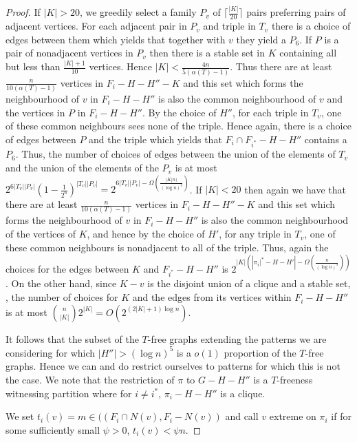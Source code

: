 \documentclass[12pt]{article}
\theoremstyle{definition}
\begin{document}
\begin{proof}
If $|K| >20$, we greedily  select a family $P_v$   of $\lceil \frac{|K|}{20} \rceil$ pairs 
preferring pairs of adjacent vertices. For each  adjacent pair in $P_v$ and triple in $T_v$ there is a choice of edges between them which yields that together 
with $v$ they yield a $P_6$. If $P$ is a pair of nonadjacent vertices in $P_v$ then there is a stable set in $K$ containing all but  less than $\frac{|K|+1}{10}$
vertices. Hence $|K|<\frac{4n}{5(\alpha(T)-1)}$. Thus there are at least $\frac{n}{10(\alpha(T)-1)}$ vertices in $F_i-H-H''-K$ and this set which forms the neighbourhood of $v$ 
in $F_i-H-H''$ is also the common neighbourhood of $v$ and the vertices in $P$ in $F_i-H-H''$. By the choice of $H''$, for each triple  in $T_v$, one of these common neighbours 
sees none of the triple.  Hence again,  there is a choice of edges between $P$ and the triple  which yields that $F_i \cap F_{i^*}-H-H''$
contains  a $P_6$. Thus, the number of choices of edges between the union of the elements of $T_v$ and the union of the elements 
of the $P_v$ is at most $2^{6|T_v||P_v|}(1-\frac{1}{2^6})^{|T_v||P_v|}=  2^{6|T_v||P_v|- \Omega(\frac{|K|n)}{(\log n)^3})}$. 
If $|K|<20$ then again we have that there are at least $\frac{n}{10(\alpha(T)-1)}$ vertices in $F_i-H-H''-K$ and this set which forms the neighbourhood of $v$ 
in $F_i-H-H''$ is also the common neighbourhood of the vertices of $K$, and hence by the choice of $H'$, for any triple in $T_v$, one of these common neighbours 
is nonadjacent to all of the triple. 
Thus, again the choices for the edges between $K$ and $F_{i^*}-H-H''$ is $2^{|K|(|\pi_i{|^*}-H-H'|-\Omega(\frac{n}{(\log n)^3}))}$. 
On the other hand,  since $K-v$ is the disjoint union of a clique and a stable set, , the number of choices for $K$ and the edges from its vertices within $F_i-H-H''$  is at most ${n \choose |K|}2^{|K|}
=O(2^{(2|K|+1)\log n})$. 

It  follows that the subset of the $T$-free graphs extending the patterns we are considering for which $|H''|>(\log n)^5$ is a $o(1)$ proportion of the $T$-free graphs.
Hence we can and do restrict ourselves to patterns for which this is not the case. We note that  the restriction of $\pi$ to $G-H-H''$ is a $T$-freeness witnessing partition 
where for $i \neq i^*$, $\pi_i-H-H''$ is a clique. 

We set $t_i(v)=m\in((F_i \cap N(v), F_i-N(v))$ and call $v$ extreme on $\pi_i$ if for some sufficiently small $\psi>0$,  $t_i(v)< \psi n$. 


\end{proof}
\end{document}
